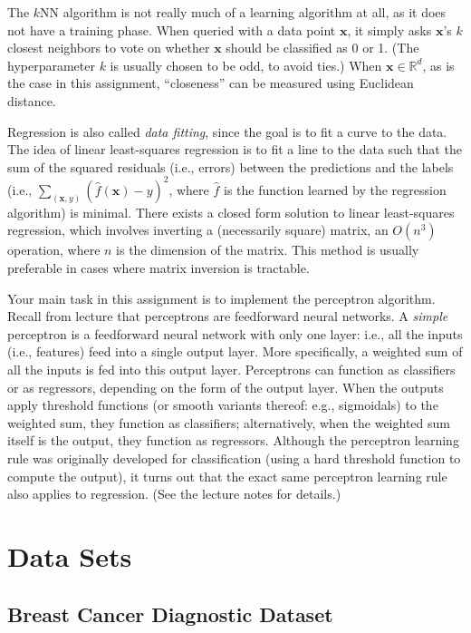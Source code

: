 \documentclass{article}
\begin{document}
The $k$NN algorithm is not really much of a learning algorithm at all,
as it does not have a training phase.
When queried with a data point $\bm{x}$,
it simply asks $\bm{x}$'s $k$ closest neighbors to vote on whether $\bm{x}$ should be classified as 0 or 1.
(The hyperparameter $k$ is usually chosen to be odd, to avoid ties.)
When $\bm{x} \in \mathbb{R}^d$, as is the case in this assignment,
``closeness'' can be measured using Euclidean distance.

Regression is also called \emph{data fitting}, since the goal is to fit a curve to the data.
The idea of linear least-squares regression is to fit a line to the data
such that the sum of the squared residuals (i.e., errors)
between the predictions and the labels (i.e., $\sum_{(\bm{x}, y)} (\hat{f}(\bm{x}) - y)^2$,
where $\hat{f}$ is the function learned by the regression algorithm) is minimal.
There exists a closed form solution to linear least-squares regression,
which involves inverting a (necessarily square) matrix,
an $O(n^3)$ operation, where $n$ is the dimension of the matrix.
This method is usually preferable in cases where matrix inversion is tractable.

Your main task in this assignment is to implement the perceptron algorithm.
Recall from lecture that perceptrons are feedforward neural networks.
A \emph{simple\/} perceptron is a feedforward neural network with only one layer:
i.e., all the inputs (i.e., features) feed into a single output layer.
More specifically, a weighted sum of all the inputs is fed into this output layer.
Perceptrons can function as classifiers or as regressors, depending on the form of the output layer.
When the outputs apply threshold functions (or smooth variants thereof: e.g., sigmoidals) to the weighted sum,
they function as classifiers;
alternatively, when the weighted sum itself is the output, they function as regressors.
Although the perceptron learning rule was originally developed for classification
(using a hard threshold function to compute the output),
it turns out that the exact same perceptron learning rule also applies to regression.
(See the lecture notes for details.)


\section{Data Sets}

\subsection{Breast Cancer Diagnostic Dataset}
\end{document}
